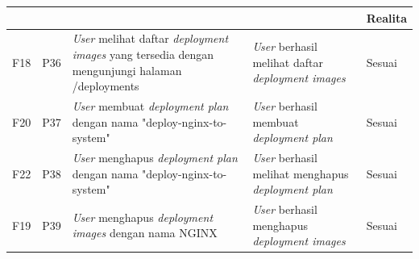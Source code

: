 \bgroup
\begin{table}[ht]
  \def\arraystretch{1.3}
  \centering
  \begin{tabular}{|p{2cm}|p{2cm}|p{4cm}|p{3cm}|p{2cm}|}
    \hline
    \centering{ID Fungsional} & \centering{ID Pengujian} & \centering{Skenario}                                                                                          & \centering{Ekspektasi}                                            & Realita \\
    \hline

    F18                       & P36                      & \textit{User} melihat daftar \textit{deployment images} yang tersedia dengan mengunjungi halaman /deployments & \textit{User} berhasil melihat daftar \textit{deployment images}  & Sesuai  \\
    \hline
    F20                       & P37                      & \textit{User} membuat \textit{deployment plan} dengan nama "deploy-nginx-to-system"                           & \textit{User} berhasil membuat \textit{deployment plan}           & Sesuai  \\
    \hline
    F22                       & P38                      & \textit{User} menghapus \textit{deployment plan} dengan nama "deploy-nginx-to-system"                         & \textit{User} berhasil melihat menghapus \textit{deployment plan} & Sesuai  \\
    \hline
    F19                       & P39                      & \textit{User} menghapus \textit{deployment images} dengan nama NGINX                                          & \textit{User} berhasil menghapus \textit{deployment images}       & Sesuai  \\
    \hline
  \end{tabular}
\end{table}
\egroup